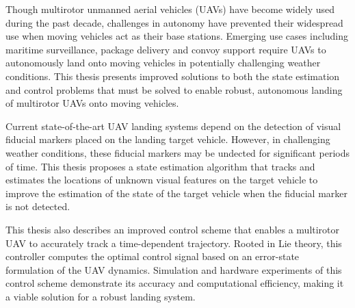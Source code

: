 \afterpage{\cleardoublepage}
Though multirotor unmanned aerial vehicles (UAVs) have become widely used 
during the past decade, challenges in autonomy have prevented their
widespread use when moving vehicles act as their base stations.
Emerging use cases including maritime
surveillance, package delivery and convoy support require UAVs to autonomously
land onto moving vehicles in potentially challenging weather
conditions. This thesis presents improved solutions to both the state estimation and
control problems that must be solved
to enable robust, autonomous landing of multirotor UAVs onto moving vehicles.

Current state-of-the-art UAV landing systems depend on the detection of visual
fiducial markers placed on the landing target vehicle. However, in challenging
weather conditions, these fiducial markers may be undected for significant
periods of time. This thesis proposes a state estimation algorithm that tracks
and estimates the locations of unknown visual features on the target vehicle to
improve the estimation
of the state of the target vehicle
when the fiducial marker is not detected.

This thesis also describes an improved control scheme that enables a multirotor
UAV to accurately track a time-dependent trajectory. Rooted in Lie theory, this
controller computes the optimal control signal based on an error-state
formulation of the UAV dynamics.
Simulation and hardware experiments of this control scheme demonstrate its
accuracy and computational efficiency, making it a viable solution for a
robust landing system.

